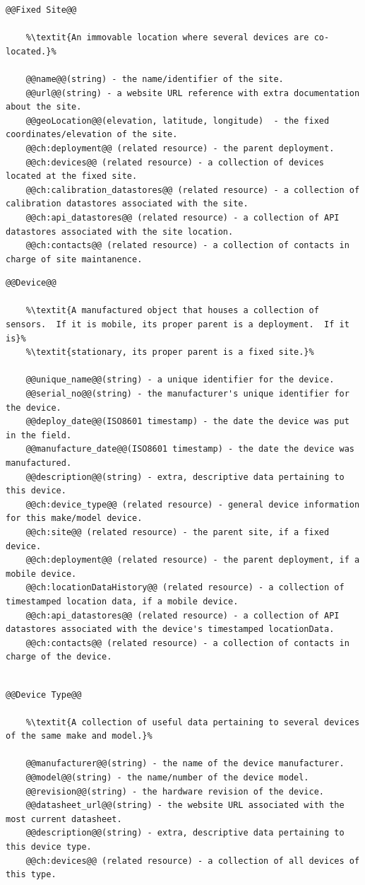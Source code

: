\begin{lstlisting}[style=codedef]
@@Fixed Site@@
	
	%\textit{An immovable location where several devices are co-located.}%

	@@name@@(string) - the name/identifier of the site.
	@@url@@(string) - a website URL reference with extra documentation about the site.
	@@geoLocation@@(elevation, latitude, longitude)  - the fixed coordinates/elevation of the site.
	@@ch:deployment@@ (related resource) - the parent deployment.
	@@ch:devices@@ (related resource) - a collection of devices located at the fixed site.
	@@ch:calibration_datastores@@ (related resource) - a collection of calibration datastores associated with the site.
	@@ch:api_datastores@@ (related resource) - a collection of API datastores associated with the site location.	
	@@ch:contacts@@ (related resource) - a collection of contacts in charge of site maintanence.

\end{lstlisting}

\begin{lstlisting}[style=codedef]
@@Device@@
	
	%\textit{A manufactured object that houses a collection of sensors.  If it is mobile, its proper parent is a deployment.  If it is}%
	%\textit{stationary, its proper parent is a fixed site.}%

	@@unique_name@@(string) - a unique identifier for the device.
	@@serial_no@@(string) - the manufacturer's unique identifier for the device.
	@@deploy_date@@(ISO8601 timestamp) - the date the device was put in the field.	
	@@manufacture_date@@(ISO8601 timestamp) - the date the device was manufactured.
	@@description@@(string) - extra, descriptive data pertaining to this device.
	@@ch:device_type@@ (related resource) - general device information for this make/model device.
	@@ch:site@@ (related resource) - the parent site, if a fixed device.
	@@ch:deployment@@ (related resource) - the parent deployment, if a mobile device.
	@@ch:locationDataHistory@@ (related resource) - a collection of timestamped location data, if a mobile device.
	@@ch:api_datastores@@ (related resource) - a collection of API datastores associated with the device's timestamped locationData.
	@@ch:contacts@@ (related resource) - a collection of contacts in charge of the device.
	
\end{lstlisting}

\begin{lstlisting}[style=codedef]
@@Device Type@@
	
	%\textit{A collection of useful data pertaining to several devices of the same make and model.}%

	@@manufacturer@@(string) - the name of the device manufacturer.
	@@model@@(string) - the name/number of the device model.
	@@revision@@(string) - the hardware revision of the device.
	@@datasheet_url@@(string) - the website URL associated with the most current datasheet.
	@@description@@(string) - extra, descriptive data pertaining to this device type.
	@@ch:devices@@ (related resource) - a collection of all devices of this type.

\end{lstlisting}

